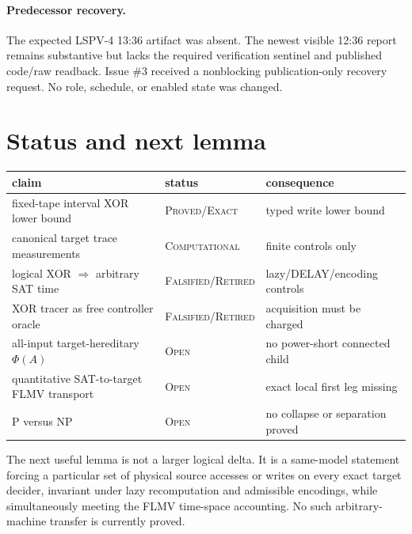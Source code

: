 \documentclass[11pt]{article}
\newcommand{\Status}[1]{\textsc{#1}}
\begin{document}
\paragraph{Predecessor recovery.}
The expected LSPV-4 13:36 artifact was absent.  The newest visible 12:36 report
remains substantive but lacks the required verification sentinel and published
code/raw readback.  Issue \#3 received a nonblocking publication-only recovery
request.  No role, schedule, or enabled state was changed.

\section{Status and next lemma}
\begin{center}
\begin{tabular}{p{.39\linewidth}p{.20\linewidth}p{.31\linewidth}}
\toprule
claim & status & consequence\\
\midrule
fixed-tape interval XOR lower bound & \Status{Proved/Exact} & typed write lower bound\\
canonical target trace measurements & \Status{Computational} & finite controls only\\
logical XOR $\Rightarrow$ arbitrary SAT time & \Status{Falsified/Retired} & lazy/DELAY/encoding controls\\
XOR tracer as free controller oracle & \Status{Falsified/Retired} & acquisition must be charged\\
all-input target-hereditary $\Phi(A)$ & \Status{Open} & no power-short connected child\\
quantitative SAT-to-target FLMV transport & \Status{Open} & exact local first leg missing\\
P versus NP & \Status{Open} & no collapse or separation proved\\
\bottomrule
\end{tabular}
\end{center}
The next useful lemma is not a larger logical delta.  It is a same-model
statement forcing a particular set of physical source accesses or writes on
every exact target decider, invariant under lazy recomputation and admissible
encodings, while simultaneously meeting the FLMV time-space accounting.  No
such arbitrary-machine transfer is currently proved.

\end{document}
